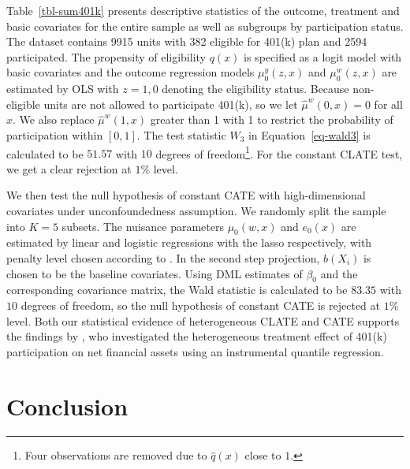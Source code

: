 \documentclass[
  12pt,
  12pt]{article}
\numberwithin{equation}{section}
\theoremstyle{definition}
\theoremstyle{plain}
\theoremstyle{plain}
\theoremstyle{remark}
\begin{document}
Table~\ref{tbl-sum401k} presents descriptive statistics of the outcome,
treatment and basic covariates for the entire sample as well as
subgroups by participation status. The dataset contains 9915 units with
382 eligible for 401(k) plan and 2594 participated. The propensity of
eligibility \(q(x)\) is specified as a logit model with basic covariates
and the outcome regression models \(\mu^y_0(z, x)\) and
\(\mu^w_0(z, x)\) are estimated by OLS with \(z = 1, 0\) denoting the
eligibility status. Because non-eligible units are not allowed to
participate 401(k), so we let \(\hat\mu^w(0, x) = 0\) for all \(x\). We
also replace \(\hat\mu^w(1, x)\) greater than 1 with 1 to restrict the
probability of participation within \([0, 1]\). The test statistic
\(W_3\) in Equation~\ref{eq-wald3} is calculated to be \(51.57\) with
\(10\) degrees of freedom\footnote{Four observations are removed due to
  \(\hat{q}(x)\) close to \(1\).}. For the constant CLATE test, we get a
clear rejection at \(1\%\) level.

We then test the null hypothesis of constant CATE with high-dimensional
covariates under unconfoundedness assumption. We randomly split the
sample into \(K = 5\) subsets. The nuisance parameters \(\mu_0(w, x)\)
and \(e_0(x)\) are estimated by linear and logistic regressions with the
lasso respectively, with penalty level chosen according to
\citet{belloni2014high}. In the second step projection, \(b(X_i)\) is
chosen to be the baseline covariates. Using DML estimates of \(\beta_0\)
and the corresponding covariance matrix, the Wald statistic is
calculated to be \(83.35\) with \(10\) degrees of freedom, so the null
hypothesis of constant CATE is rejected at \(1\%\) level. Both our
statistical evidence of heterogeneous CLATE and CATE supports the
findings by \citet{chernozhukov2004effects}, who investigated the
heterogeneous treatment effect of 401(k) participation on net financial
assets using an instrumental quantile regression.

\section{Conclusion}\label{sec-conclude}
\end{document}

